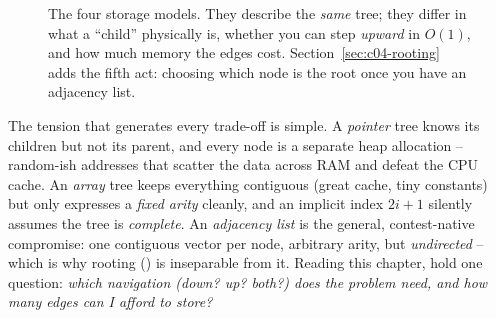 \begin{figure}[H]
\centering
{}
\caption{The four storage models. They describe the \emph{same} tree; they differ in
what a ``child'' physically is, whether you can step \emph{upward} in $O(1)$, and how
much memory the edges cost. Section~\ref{sec:c04-rooting} adds the fifth act: choosing
which node is the root once you have an adjacency list.}\label{fig:c04-models}
\end{figure}

The tension that generates every trade-off is simple. A \emph{pointer} tree knows its
children but not its parent, and every node is a separate heap allocation -- random-ish
addresses that scatter the data across RAM and defeat the CPU cache. An \emph{array}
tree keeps everything contiguous (great cache, tiny constants) but only expresses a
\emph{fixed arity} cleanly, and an implicit index $2i{+}1$ silently assumes the tree is
\emph{complete}. An \emph{adjacency list} is the general, contest-native compromise:
one contiguous vector per node, arbitrary arity, but \emph{undirected} -- which is why
rooting () is inseparable from it. Reading this chapter, hold one
question: \emph{which navigation (down? up? both?) does the problem need, and how many
edges can I afford to store?}


